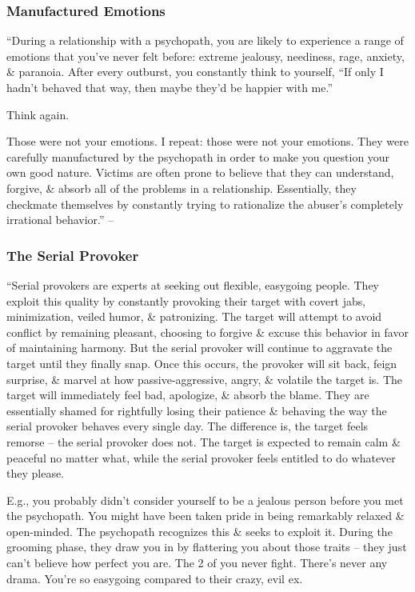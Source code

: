\documentclass{article}
\numberwithin{equation}{section}
\begin{document}
\subsubsection{Manufactured Emotions}
``During a relationship with a psychopath, you are likely to experience a range of emotions that you've never felt before: extreme jealousy, neediness, rage, anxiety, \& paranoia. After every outburst, you constantly think to yourself, ``If only I hadn't behaved that way, then maybe they'd be happier with me.''

Think again.

Those were not your emotions. I repeat: those were not your emotions. They were carefully manufactured by the psychopath in order to make you question your own good nature. Victims are often prone to believe that they can understand, forgive, \& absorb all of the problems in a relationship. Essentially, they checkmate themselves by constantly trying to rationalize the abuser's completely irrational behavior.'' -- \cite[p. 39]{MacKenzie2015}

\subsubsection{The Serial Provoker}
``Serial provokers are experts at seeking out flexible, easygoing people. They exploit this quality by constantly provoking their target with covert jabs, minimization, veiled humor, \& patronizing. The target will attempt to avoid conflict by remaining pleasant, choosing to forgive \& excuse this behavior in favor of maintaining harmony. But the serial provoker will continue to aggravate the target until they finally snap. Once this occurs, the provoker will sit back, feign surprise, \& marvel at how passive-aggressive, angry, \& volatile the target is. The target will immediately feel bad, apologize, \& absorb the blame. They are essentially shamed for rightfully losing their patience \& behaving the way the serial provoker behaves every single day. The difference is, the target feels remorse -- the serial provoker does not. The target is expected to remain calm \& peaceful no matter what, while the serial provoker feels entitled to do whatever they please.

E.g., you probably didn't consider yourself to be a jealous person before you met the psychopath. You might have been taken pride in being remarkably relaxed \& open-minded. The psychopath recognizes this \& seeks to exploit it. During the grooming phase, they draw you in by flattering you about those traits -- they just can't believe how perfect you are. The 2 of you never fight. There's never any drama. You're so easygoing compared to their crazy, evil ex.
\end{document}

